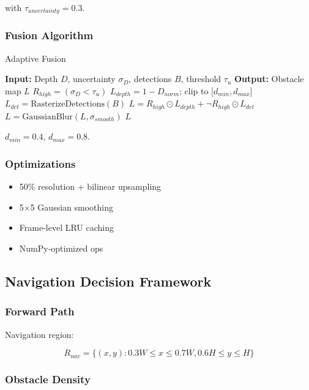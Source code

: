 \documentclass[12pt,oneside]{book}
\begin{document}
with $\tau_{uncertainty} = 0.3$.

\subsubsection{Fusion Algorithm}

\begin{algorithm}
\caption{Adaptive Fusion}
\begin{algorithmic}
\STATE \textbf{Input:} Depth $D$, uncertainty $\sigma_D$, detections $B$, threshold $\tau_u$
\STATE \textbf{Output:} Obstacle map $L$
\STATE $R_{high} = (\sigma_D < \tau_u)$
\STATE $L_{depth} = 1 - D_{norm}$; clip to [$d_{min}, d_{max}$]
\STATE $L_{det} = \text{RasterizeDetections}(B)$
\STATE $L = R_{high} \odot L_{depth} + \neg R_{high} \odot L_{det}$
\STATE $L = \text{GaussianBlur}(L, \sigma_{smooth})$
\RETURN $L$
\end{algorithmic}
\end{algorithm}

$d_{min}=0.4$, $d_{max}=0.8$.

\subsubsection{Optimizations}
\begin{itemize}
\item 50\% resolution + bilinear upsampling
\item 5$\times$5 Gaussian smoothing
\item Frame-level LRU caching
\item NumPy-optimized ops
\end{itemize}

\subsection{Navigation Decision Framework}

\subsubsection{Forward Path}

Navigation region:

\begin{equation}
R_{nav} = \{(x,y): 0.3W \leq x \leq 0.7W, 0.6H \leq y \leq H\}
\label{eq:navigation_region_detailed}
\end{equation}

\subsubsection{Obstacle Density}
\end{document}
